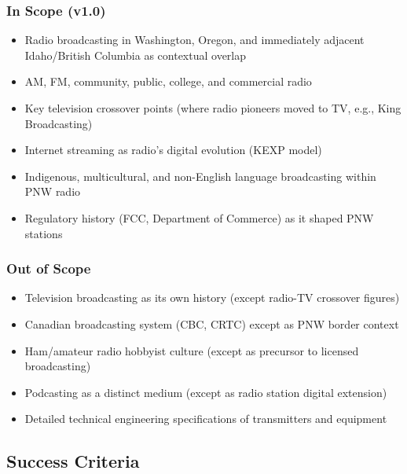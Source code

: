 \documentclass[11pt,letterpaper]{article}
\begin{document}
\subsubsection{In Scope (v1.0)}
\begin{itemize}[leftmargin=2em]
\item Radio broadcasting in Washington, Oregon, and immediately adjacent Idaho/British Columbia as contextual overlap
\item AM, FM, community, public, college, and commercial radio
\item Key television crossover points (where radio pioneers moved to TV, e.g., King Broadcasting)
\item Internet streaming as radio's digital evolution (KEXP model)
\item Indigenous, multicultural, and non-English language broadcasting within PNW radio
\item Regulatory history (FCC, Department of Commerce) as it shaped PNW stations
\end{itemize}

\subsubsection{Out of Scope}
\begin{itemize}[leftmargin=2em]
\item Television broadcasting as its own history (except radio-TV crossover figures)
\item Canadian broadcasting system (CBC, CRTC) except as PNW border context
\item Ham/amateur radio hobbyist culture (except as precursor to licensed broadcasting)
\item Podcasting as a distinct medium (except as radio station digital extension)
\item Detailed technical engineering specifications of transmitters and equipment
\end{itemize}

\subsection{Success Criteria}
\end{document}
